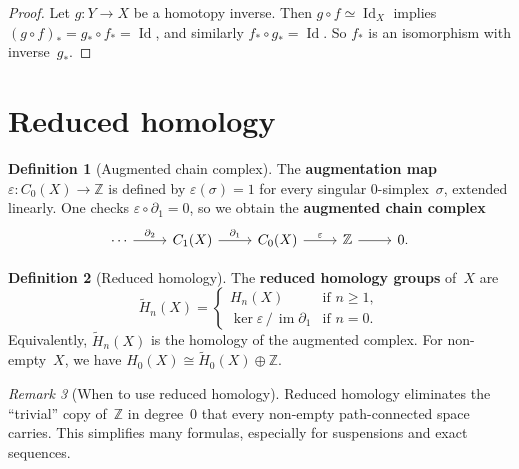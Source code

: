\documentclass[12pt,a4paper,openany]{book}
\theoremstyle{definition}
\newtheorem{definition}{Definition}[chapter]
\theoremstyle{plain}
\theoremstyle{remark}
\newtheorem{remark}[definition]{Remark}
\newcommand{\Z}{\mathbb{Z}}
\DeclareMathOperator{\im}{im}
\DeclareMathOperator{\Id}{Id}
\begin{document}
\begin{proof}
Let $g\colon Y\to X$ be a homotopy inverse.  Then $g\circ f\simeq\Id_X$
implies $(g\circ f)_*=g_*\circ f_*=\Id$, and similarly
$f_*\circ g_*=\Id$.  So $f_*$ is an isomorphism with inverse~$g_*$.
\end{proof}

\section{Reduced homology}\label{sec:reduced-homology}

\begin{definition}[Augmented chain complex]\label{def:augmented-complex}
The \textbf{augmentation map} $\varepsilon\colon C_0(X)\to\Z$ is defined by
$\varepsilon(\sigma)=1$ for every singular $0$-simplex~$\sigma$, extended
linearly.  One checks $\varepsilon\circ\partial_1=0$, so we obtain the
\textbf{augmented chain complex}
\[
\begin{tikzcd}
  \cdots \ar[r,"\partial_2"]
  & C_1(X) \ar[r,"\partial_1"]
  & C_0(X) \ar[r,"\varepsilon"]
  & \Z \ar[r]
  & 0.
\end{tikzcd}
\]
\end{definition}

\begin{definition}[Reduced homology]\label{def:reduced-homology}
The \textbf{reduced homology groups} of~$X$ are
\[
  \widetilde{H}_n(X) =
  \begin{cases}
    H_n(X) & \text{if } n\ge 1,\\
    \ker\varepsilon\,/\,\im\partial_1 & \text{if } n=0.
  \end{cases}
\]
Equivalently, $\widetilde{H}_n(X)$ is the homology of the augmented complex.
For non-empty~$X$, we have $H_0(X)\cong\widetilde{H}_0(X)\oplus\Z$.
\end{definition}

\begin{remark}[When to use reduced homology]\label{rem:reduced-vs-unreduced}
Reduced homology eliminates the ``trivial'' copy of~$\Z$ in degree~$0$
that every non-empty path-connected space carries.  This simplifies
many formulas, especially for suspensions and exact sequences.
\end{remark}
\end{document}

